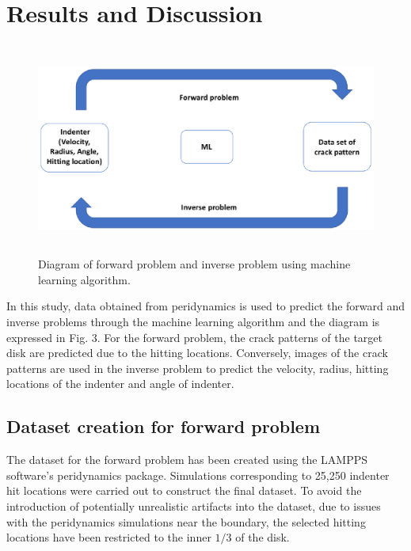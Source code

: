 \section{Results and Discussion}
\label{sec:4}


\begin{figure}
  \includegraphics[width=12cm, height=7cm]{figure/diagram.eps}

\caption{Diagram of forward problem and inverse problem using machine learning algorithm.}
\label{fig:3}       
\end{figure}

In this study, data obtained from peridynamics is used to predict the forward and inverse problems through the machine learning algorithm and the diagram is expressed in Fig. 3. For the forward problem, the crack patterns of the target disk are predicted due to the hitting locations. Conversely, images of the crack patterns are used in the inverse problem to predict the velocity, radius, hitting locations of the indenter and angle of indenter.

\subsection{Dataset creation for forward problem}
\label{forward_data}

The dataset for the forward problem has been created using the LAMPPS software's peridynamics package.  Simulations corresponding to  25,250 indenter hit locations were carried out to construct the final dataset.  To avoid the introduction of potentially unrealistic artifacts into the dataset, due to issues with the peridynamics simulations near the boundary, the selected hitting locations have been restricted to the inner $1/3$ of the disk.

